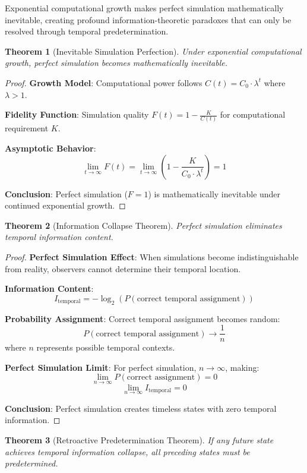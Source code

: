 \documentclass[12pt,a4paper]{article}
\newtheorem{theorem}{Theorem}[section]
\begin{document}
Exponential computational growth makes perfect simulation mathematically inevitable, creating profound information-theoretic paradoxes that can only be resolved through temporal predetermination.

\begin{theorem}[Inevitable Simulation Perfection]
Under exponential computational growth, perfect simulation becomes mathematically inevitable.
\end{theorem}

\begin{proof}
\textbf{Growth Model}: Computational power follows $C(t) = C_0 \cdot \lambda^t$ where $\lambda > 1$.

\textbf{Fidelity Function}: Simulation quality $F(t) = 1 - \frac{K}{C(t)}$ for computational requirement $K$.

\textbf{Asymptotic Behavior}:
$$\lim_{t \to \infty} F(t) = \lim_{t \to \infty} \left(1 - \frac{K}{C_0 \cdot \lambda^t}\right) = 1$$

\textbf{Conclusion}: Perfect simulation ($F = 1$) is mathematically inevitable under continued exponential growth.
\end{proof}

\begin{theorem}[Information Collapse Theorem]
Perfect simulation eliminates temporal information content.
\end{theorem}

\begin{proof}
\textbf{Perfect Simulation Effect}: When simulations become indistinguishable from reality, observers cannot determine their temporal location.

\textbf{Information Content}: 
$$I_{\text{temporal}} = -\log_2(P(\text{correct temporal assignment}))$$

\textbf{Probability Assignment}: Correct temporal assignment becomes random:
$$P(\text{correct temporal assignment}) \to \frac{1}{n}$$
where $n$ represents possible temporal contexts.

\textbf{Perfect Simulation Limit}: For perfect simulation, $n \to \infty$, making:
$$\lim_{n \to \infty} P(\text{correct assignment}) = 0$$
$$\lim_{n \to \infty} I_{\text{temporal}} = 0$$

\textbf{Conclusion}: Perfect simulation creates timeless states with zero temporal information.
\end{proof}

\begin{theorem}[Retroactive Predetermination Theorem]
If any future state achieves temporal information collapse, all preceding states must be predetermined.
\end{theorem}
\end{document}
